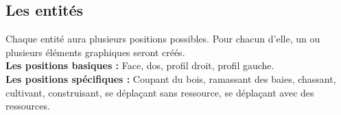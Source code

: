 \documentclass[a4paper]{article}
\begin{document}
\subsection*{Les entités}
Chaque entité aura plusieurs positions possibles. Pour chacun d'elle, un ou plusieurs éléments graphiques seront créés.\\
\textbf{Les positions basiques :}\small{ Face, dos, profil droit, profil gauche.}\\
\textbf{Les positions spécifiques :}\small{ Coupant du bois, ramassant des baies, chassant, cultivant, construisant, se déplaçant sans ressource, se déplaçant avec des ressources.}
\end{document}
